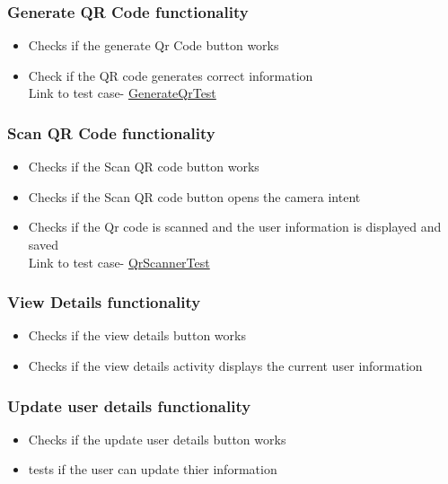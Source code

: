 \documentclass[english]{article}
\begin{document}
		\subsubsection{Generate QR Code functionality}
			\begin{itemize} 
				\item Checks if the generate Qr Code button works
				\item Check if the QR code generates correct information
				\\	Link to test case-
					\href{https://github.com/XoloKDandashe/Alpha-Tech/blob/master/Code/NFCBusinessCardLocal2/app/src/androidTest/java/com/example/www/nfcbusinesscardlocal/GenerateQrTest.java}{GenerateQrTest}

			\end{itemize}
	\subsubsection{Scan QR Code functionality}
			\begin{itemize} 
				\item Checks if the Scan QR code button works
				\item Checks if the Scan QR code button opens the camera intent
				\item Checks if the Qr code is scanned and the user information is displayed and saved
\\	Link to test case-
					\href{https://github.com/XoloKDandashe/Alpha-Tech/blob/master/Code/NFCBusinessCardLocal2/app/src/androidTest/java/com/example/www/nfcbusinesscardlocal/SendViaQrTest.java}{QrScannerTest}
			\end{itemize}
		\subsubsection{View Details functionality}
			\begin{itemize} 
				\item Checks if the view details button works
				\item Checks if the view details activity displays the current user information

			\end{itemize}
		\subsubsection{Update user details functionality}
			\begin{itemize} 
				\item Checks if the update user details button works
				\item tests if the user can update thier information

			\end{itemize}
\end{document}
